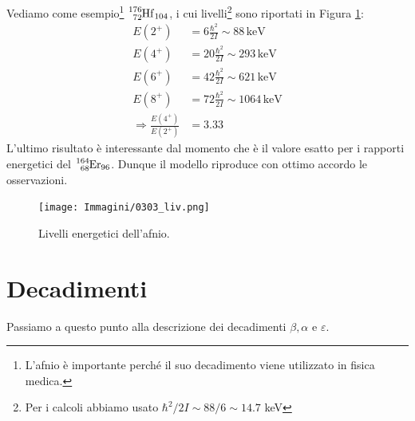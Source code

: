 \noindent Vediamo come esempio\footnote{L'afnio è importante perché il suo decadimento viene utilizzato in fisica medica.} $\ce{^{176}_{72}Hf_{104}}$, i cui livelli\footnote{Per i calcoli abbiamo usato $\hbar^2/2I \sim 88/6 \sim 14.7$ keV} sono riportati in Figura \ref{0303_livel}:
\begin{displaymath}
\begin{aligned}
E(2^+)&= 6\frac{\hbar^2}{2I}\sim 88\, \mbox{keV} \\
E(4^+)&= 20\frac{\hbar^2}{2I}\sim 293\, \mbox{keV} \\
E(6^+)&= 42\frac{\hbar^2}{2I}\sim 621\, \mbox{keV} \\
E(8^+)&= 72\frac{\hbar^2}{2I}\sim 1064\, \mbox{keV} \\
\Rightarrow \frac{E(4^+)}{E(2^+)}&= 3.33
\end{aligned}
\end{displaymath}
L'ultimo risultato è interessante dal momento che è il valore esatto per i rapporti energetici del $\ce{^{164}_{68}Er_{96}}$. Dunque il modello riproduce con ottimo accordo le osservazioni.

\begin{figure}[h]
    \centering
    \texttt{[image: Immagini/0303\_liv.png]}
    \caption{Livelli energetici dell'afnio.}
    \label{0303_livel}
\end{figure}

\chapter{Decadimenti}
Passiamo a questo punto alla descrizione dei decadimenti $\beta,\alpha$ e $\varepsilon$.
